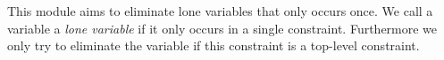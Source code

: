This module aims to eliminate lone variables that only occurs once.
We call a variable a \emph{lone variable} if it only occurs in a single constraint.
Furthermore we only try to eliminate the variable if this constraint is a top-level constraint.
